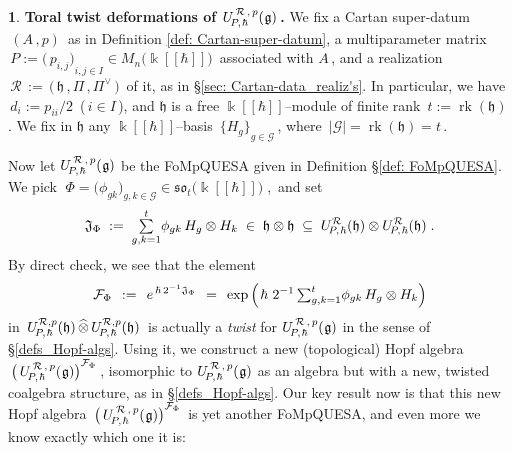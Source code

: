 \documentclass[12pt,reqno,twoside,a4paper]{amsart}
\numberwithin{equation}{section}
\theoremstyle{definition}
\newtheorem{free text}[lema]{}
\theoremstyle{remark}
\newcommand \rk{\operatorname{rk}}
\newcommand{\R}{{\mathcal R}}
\newcommand{\F}{{\mathcal F}}
\newcommand{\G}{{\mathcal G}}
\def \kh{{\Bbbk[[\hbar]]}}
\def \G {\mathcal{G}}
\def \JJ {\mathfrak{J}}
\def \lieg{\mathfrak{g}}
\def \lieh{\mathfrak{h}}
\def \lieso{\mathfrak{so}}
\def \uRpPhg{U^{\,\R\,,\,p}_{\!P,\hskip0,7pt\hbar}(\hskip0,5pt\lieg)}
\theoremstyle{plain}
\begin{document}
\begin{free text}  \label{twist-uPhgd}
%
 {\bf Toral twist deformations of  $ \uRpPhg \, $.}
%
 We fix a Cartan super-datum  $ \, (A\,,p) \, $  as in  Definition  \ref{def: Cartan-super-datum},
 a multiparameter matrix  $ \, P := {\big(\, p_{i,j} \big)}_{i, j \in I} \in M_n\big(\kh\big) \, $
 associated with  $ A \, $, and a realization  $ \, \R \, := \, \big(\, \lieh \, , \Pi \, , \Pi^\vee \,\big) \, $  of it,
 as in  \S \ref{sec: Cartan-data_realiz's}.  In particular, we have  $ \, d_i := p_{ii}/2 \, $  ($ \, i \in I \, $),
 and  $ \lieh $  is a free  $ \kh $--module  of finite rank  $ \, t := \rk(\lieh) \, $.  We fix in
 $ \lieh $  any  $ \kh $--basis  $ \, {\big\{ H_g \big\}}_{g \in \G} \, $,  where  $ \, |\G| = \rk(\lieh) = t \, $.
                                                              \par
   Now let  $ \uRpPhg $  be the FoMpQUESA given in  Definition \S \ref{def: FoMpQUESA}.
   We pick  $ \; \Phi = \big( \phi_{gk} \big)_{g, k \in \G} \in \lieso_t\big(\kh\big)  \; $,  \,and set
%
  $$
  \JJ_\Phi  \; := \;  {\textstyle \sum\limits_{g,k=1}^t} \phi_{gk} \, H_g \otimes H_k  \; \in \;
  \lieh \otimes \lieh  \; \subseteq \; U^\R_{\!P,\hskip0,7pt\hbar}(\lieh) \otimes U^\R_{\!P,\hskip0,7pt\hbar}(\lieh)\;.
  $$
%
 By direct check, we see that the element
%
\begin{equation}  \label{eq: Resh-twist_F-uPhgd}
  \F_\Phi  \,\; := \;\,
e^{\,\hbar \, 2^{-1} \JJ_\Phi}
 \,\; = \;\,  \exp\Big(\hskip1pt \hbar \,  \, 2^{-1} \,
 {\textstyle \sum_{g,k=1}^t} \phi_{gk} \, H_g \otimes H_k \Big)
%
\end{equation}
%
 in  $ \, U^{\R,p}_{\!P,\hskip0,7pt\hbar}(\lieh) \,\widehat{\otimes}\, U^{\R,p}_{\!P,\hskip0,7pt\hbar}(\lieh) \, $  is actually a  {\sl twist\/}  for  $ \uRpPhg $  in the sense of  \S \ref{defs_Hopf-algs}.  Using it, we construct a new (topological) Hopf algebra  $ \, {\big(\, \uRpPhg \big)}^{\F_\Phi} \, $,  isomorphic to  $ \uRpPhg $  as an algebra but with a new, twisted coalgebra structure, as in  \S \ref{defs_Hopf-algs}.
%
 \vskip5pt
%
   Our key result now is that this new Hopf algebra  $ \, {\big(\, \uRpPhg \big)}^{\F_\Phi} \, $  is yet another FoMpQUESA, and even more we know exactly which one it is:
%
\end{free text}

\vskip11pt
\end{document}
